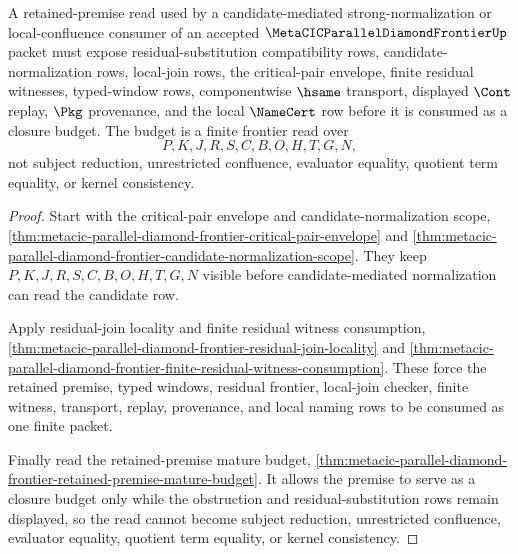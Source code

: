 \begin{theorem}
\label{thm:metacic-parallel-diamond-frontier-retained-premise-closure}
A retained-premise read used by a candidate-mediated strong-normalization or local-confluence consumer of an accepted $\MetaCICParallelDiamondFrontierUp$ packet must expose residual-substitution compatibility rows, candidate-normalization rows, local-join rows, the critical-pair envelope, finite residual witnesses, typed-window rows, componentwise $\hsame$ transport, displayed $\Cont$ replay, $\Pkg$ provenance, and the local $\NameCert$ row before it is consumed as a closure budget. The budget is a finite frontier read over
$$
P,K,J,R,S,C,B,O,H,T,G,N,
$$
not subject reduction, unrestricted confluence, evaluator equality, quotient term equality, or kernel consistency.
\end{theorem}
\begin{proof}
Start with the critical-pair envelope and candidate-normalization scope, \autoref{thm:metacic-parallel-diamond-frontier-critical-pair-envelope} and \autoref{thm:metacic-parallel-diamond-frontier-candidate-normalization-scope}. They keep $P,K,J,R,S,C,B,O,H,T,G,N$ visible before candidate-mediated normalization can read the candidate row.

Apply residual-join locality and finite residual witness consumption, \autoref{thm:metacic-parallel-diamond-frontier-residual-join-locality} and \autoref{thm:metacic-parallel-diamond-frontier-finite-residual-witness-consumption}. These force the retained premise, typed windows, residual frontier, local-join checker, finite witness, transport, replay, provenance, and local naming rows to be consumed as one finite packet.

Finally read the retained-premise mature budget, \autoref{thm:metacic-parallel-diamond-frontier-retained-premise-mature-budget}. It allows the premise to serve as a closure budget only while the obstruction and residual-substitution rows remain displayed, so the read cannot become subject reduction, unrestricted confluence, evaluator equality, quotient term equality, or kernel consistency.
\end{proof}

